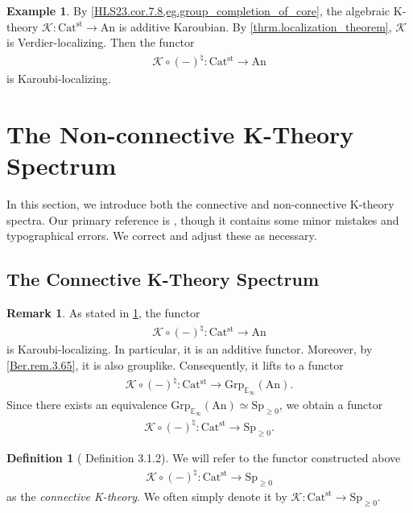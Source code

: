 \documentclass[a4paper,dvipdfmx,11pt,reqno]{amsart}
\newcommand{\K}{\mathcal{K}}
\newcommand{\An}{\mathrm{An}}
\newcommand{\Catst}{\mathrm{Cat^{st}}}
\newcommand{\Grp}{\mathrm{Grp}_{\mathbb{E}_{\infty}}}
\newcommand{\Sp}{\mathrm{Sp}}
\theoremstyle{definition}
\newtheorem{definition}[theorem]{Definition}
\newtheorem{example}[theorem]{Example}
\newtheorem{remark}[theorem]{Remark}
\begin{document}
\begin{example} \label{Ber.cor.5.52}
  By \cref{HLS23.cor.7.8,eg.group_completion_of_core}, the algebraic K-theory $\K : \Catst \to \An$ is additive Karoubian.
  By \cref{thrm.localization_theorem}, $\K$ is Verdier-localizing.
  Then the functor 
  \begin{align*}
    \K \circ (-)^{\natural} : \Catst \to \An
  \end{align*}
  is Karoubi-localizing.
\end{example}


\section{The Non-connective K-Theory Spectrum}

In this section, we introduce both the connective and non-connective K-theory spectra.
Our primary reference is \cite{KNP24}, though it contains some minor mistakes and typographical errors.
We correct and adjust these as necessary.

\subsection{The Connective K-Theory Spectrum}

\begin{remark}
  As stated in \cref{Ber.cor.5.52}, the functor 
  \begin{align*}
    \K \circ (-)^{\natural} : \Catst \to \An
  \end{align*}
  is Karoubi-localizing.
  In particular, it is an additive functor.
  Moreover, by \cref{Ber.rem.3.65}, it is also grouplike.
  Consequently, it lifts to a functor 
  \begin{align*}
    \K \circ (-)^{\natural} : \Catst \to \Grp(\An).
  \end{align*}
  Since there exists an equivalence $\Grp(\An) \simeq \Sp_{\geq 0}$, we obtain a functor 
  \begin{align*}
    \K \circ (-)^{\natural} : \Catst \to \Sp_{\geq 0}.
  \end{align*}
\end{remark}

\begin{definition}[\cite{KNP24} Definition 3.1.2] \label{KNP24.def.3.1.2}
  We will refer to the functor constructed above
  \begin{align*}
    \K \circ (-)^{\natural} : \Catst \to \Sp_{\geq 0}
  \end{align*}
  as the \textit{connective K-theory}.
  We often simply denote it by $\K : \Catst \to \Sp_{\geq 0}$.
\end{definition}
\end{document}
